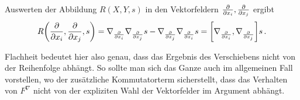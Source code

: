 \documentclass[../H_Analysis_main.tex]{subfiles}
\begin{document}






\begin{bsp}
Auswerten der Abbildung $R(X, Y, s)$ in den Vektorfeldern $\pdv{x_i}, \pdv{x_j}$ ergibt
\begin{equation*}
R\qty(\pdv{x_i}, \pdv{x_j}, s) = \nabla_{\pdv{x_i}} \nabla_{\pdv{x_j}} s - \nabla_{\pdv{x_j}} \nabla_{\pdv{x_i}} s = \qty[\nabla_{\pdv{x_i}}, \nabla_{\pdv{x_j}}] s \, .
\end{equation*}

Flachheit bedeutet hier also genau, dass das Ergebnis des Verschiebens nicht von der Reihenfolge abhängt. So sollte man sich das Ganze auch im allgemeinen Fall vorstellen, wo der zusätzliche Kommutatorterm sicherstellt, dass das Verhalten von $F^\nabla$ nicht von der expliziten Wahl der Vektorfelder im Argument abhängt.
\end{bsp}


\iffalse
\begin{figure}
\centering

\subfloat[Parallelogram im $\mathbb{R}^2$]{\texttt{[image: Bilder/parallelogram\_geschlossen.pdf]}}
\subfloat[Parallelogram auf der 2-Sphäre]{\texttt{[image: Bilder/parallelogram\_ungeschlossen.pdf]}}

\caption[Parallelogramme]{Im Gegensatz zum flachen $\mathbb{R}^n$ ist es in gekrümmten Räumen ist es nicht mehr so, dass sich Parallelogramme gleicher Vektoren schließen.}
\label{fig:parallelograme}
\end{figure}
\fi
\end{document}
